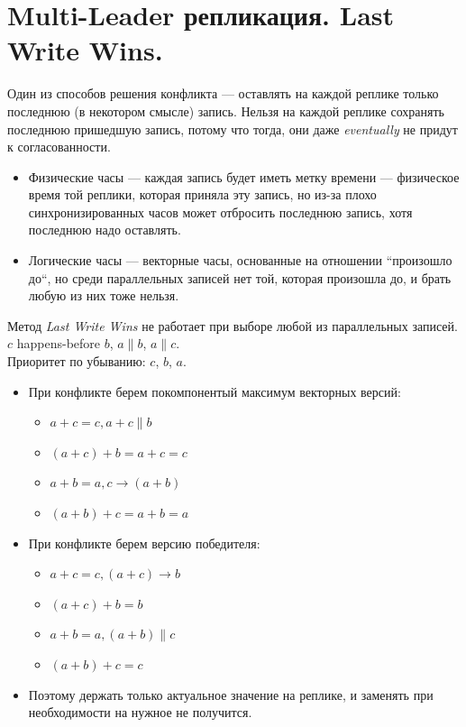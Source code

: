 \section{Multi-Leader репликация. Last Write Wins.}
    Один из способов решения конфликта --- оставлять на каждой реплике только последнюю (в некотором смысле) запись. Нельзя на каждой реплике сохранять последнюю пришедшую запись, потому что тогда, они даже \textit{eventually} не придут к согласованности.
    \begin{itemize}
        \item Физические часы --- каждая запись будет иметь метку времени --- физическое время той реплики, которая приняла эту запись, но из-за плохо синхронизированных часов может отбросить последнюю запись, хотя последнюю надо оставлять.
        \item Логические часы --- векторные часы, основанные на отношении ``произошло до``, но среди параллельных записей нет той, которая произошла до, и брать любую из них тоже нельзя.
    \end{itemize}
      \begin{definition}
        Метод \textit{Last Write Wins} не работает при выборе любой из параллельных записей.\\
          $c$ happens-before $b$, $a \parallel b$, $a \parallel c$. \\
          Приоритет по убыванию: $c$, $b$, $a$. \\
          \begin{itemize}
          \item При конфликте берем покомпонентый максимум векторных версий:
            \begin{itemize}
              \item $a + c = c, a + c \parallel b$
              \item $(a + c) + b = a + c = c$
              \item $a + b = a, c \rightarrow (a + b)$
              \item $(a + b) + c = a + b = a$
            \end{itemize}
          \item При конфликте берем версию победителя:
          \begin{itemize}
            \item $a + c = c, (a + c) \rightarrow b$
            \item $(a + c) + b = b$
            \item $a + b = a, (a + b) \parallel c$
            \item $(a + b) + c = c$
          \end{itemize}
         \item Поэтому держать только актуальное значение на реплике, и заменять при необходимости на нужное не получится.
        \end{itemize}
      \end{definition}
